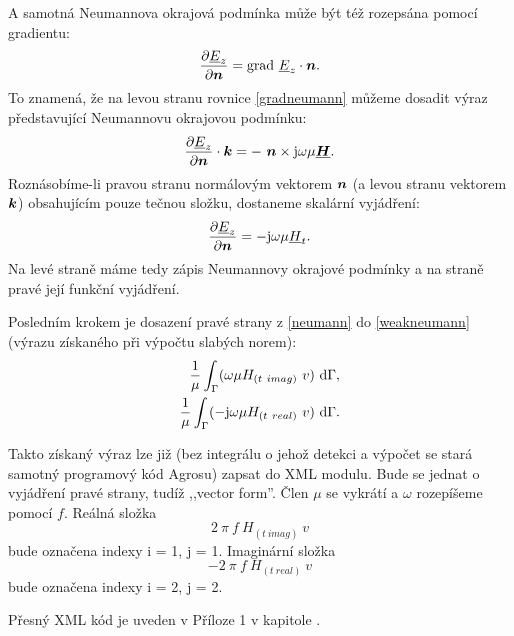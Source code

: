 \documentclass[12pt,a4paper,oneside]{article}
\numberwithin{equation}{section} %
\numberwithin{figure}{section} %
\numberwithin{table}{section} %
\newcommand{\mj}{\mathrm{j}} %
\renewcommand{\vec}[1]{\mbox{\boldmath$#1$}} %
\newcommand{\faz}[1]{{\underline{#1}}} %
\newcommand{\grad}{\mathrm{grad}\ }
\begin{document}
A samotná Neumannova okrajová podmínka může být též rozepsána pomocí gradientu:
\begin{equation}
\label{gradneumann}
\frac{\partial \faz{E}_z}{\partial \vec{n}} = \grad \faz{E}_z \cdot \vec{n} .
\end{equation}
To znamená, že na levou stranu rovnice \ref{gradneumann} můžeme dosadit výraz představující Neumannovu okrajovou podmínku:
\begin{equation}
\label{NeumannEKvek}
\frac{\partial \faz{E}_z}{\partial \vec{n}} \cdot \vec{k} = - ~ \vec{n} \times \mj \omega \mu \faz{\vec{H}}.
\end{equation}
Roznásobíme-li pravou stranu normálovým vektorem $\vec{n}$ (a levou stranu vektorem $\vec{k}$) obsahujícím pouze tečnou složku, dostaneme skalární vyjádření:
\begin{equation}
\label{neumann}
\frac{\partial \faz{E}_z}{\partial \vec{n}} = - \mj \omega \mu \faz{H}_t .
\end{equation}
Na levé straně máme tedy zápis Neumannovy okrajové podmínky a na straně pravé její funkční vyjádření.

Posledním krokem je dosazení pravé strany z \ref{neumann} do \ref{weakneumann} (výrazu získaného při výpočtu slabých norem):
\begin{subequations}
\begin{align}
\frac{1}{\mu} \int _{\Gamma} ( \omega \mu H_{(t~imag)} ~ v ) ~ \ud \Gamma ,
\\ 
\frac{1}{\mu} \int _{\Gamma} ( - \mj \omega \mu H_{(t~real)} ~ v ) ~ \ud \Gamma .
\end{align}
\end{subequations}

Takto získaný výraz lze již (bez integrálu o jehož detekci a výpočet se stará samotný programový kód Agrosu) zapsat do XML modulu. Bude se jednat o vyjádření pravé strany, tudíž ,,vector form''. Člen $\mu$ se vykrátí a $\omega$ rozepíšeme pomocí $f$. Reálná složka 
\begin{equation}
2 ~ \pi ~ f ~ H_{(t~imag)} ~ v
\end{equation} 
bude označena indexy i = 1, j = 1. Imaginární složka 
\begin{equation}
- 2 ~ \pi ~ f ~ H_{(t~real)} ~ v
\end{equation}
bude označena indexy i = 2, j = 2.

Přesný XML kód je uveden v Příloze 1 v kapitole .
\end{document}
